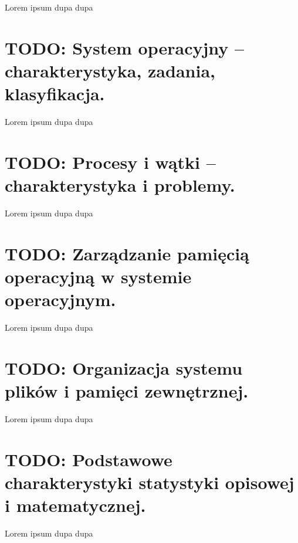 \documentclass[a4paper,12pt,oneside]{book}
\begin{document}
						Lorem ipsum dupa dupa
	
	\setcounter{section}{56}
	\section{\color{red} TODO: System operacyjny – charakterystyka, zadania, klasyfikacja. }
						
						Lorem ipsum dupa dupa
	
	\setcounter{section}{56}
	\section{\color{red} TODO: Procesy i wątki – charakterystyka i problemy. }
						
						Lorem ipsum dupa dupa
	
	\setcounter{section}{56}
	\section{\color{red} TODO: Zarządzanie pamięcią operacyjną w systemie operacyjnym. }
						
						Lorem ipsum dupa dupa
	
	\setcounter{section}{56}
	\section{\color{red} TODO: Organizacja systemu plików i pamięci zewnętrznej. }
						
						Lorem ipsum dupa dupa
						
	\setcounter{section}{56}
	\section{\color{red} TODO: Podstawowe charakterystyki statystyki opisowej i matematycznej.}
							
							Lorem ipsum dupa dupa
	
	
	
	
\end{document}
